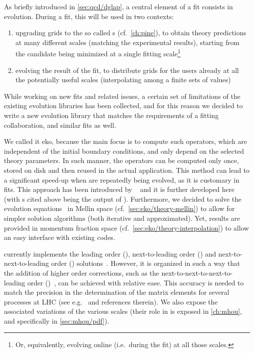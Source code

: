 
As briefly introduced in \cref{sec:qcd/dglap}, a central element of a \pdf fit
consists in \dglap evolution.
%
During a fit, this will be used in two contexts: 
\begin{enumerate}[label=\roman*.]
  \item upgrading grids to the so called \fktab{}s (cf.\ \cref{ch:pine}), to
    obtain theory predictions at many different scales (matching the
    experimental results), starting from the \pdf candidate being minimized at
    a single fitting scale\footnote{
      Or, equivalently, evolving online (i.e.\ during the fit) at all those scales.
    }
  \item evolving the result of the fit, to distribute \pdf grids for the users
    already at all the potentially useful scales (interpolating among a finite
    sets of values)
\end{enumerate}

While working on new \pdf fits and related issues, a certain set of limitations
of the existing \dglap evolution libraries has been collected, and for this
reason we decided to write a new \qcd{} evolution library that matches the
requirements of a \pdf fitting collaboration, and similar fits as well.

We called it \acrfull{eko}, because the main focus is to compute such
operators, which are independent of the initial boundary conditions, and only
depend on the selected theory parameters.
In such manner, the operators can be computed only once, stored on disk and
then reused in the actual application. This method can lead to a significant
speed-up when \pdfs are repeatedly being evolved, as it is customary in \pdf{}
fits.
This approach has been introduced by
\fk~\cite{Ball:2008by,Ball:2010de,DelDebbio:2007ee} and it is further developed
here (with \fktab{}s cited above being the output of \fk).
%
Furthermore, we decided to solve the evolution equations~ in Mellin space (cf.\
\cref{sec:eko/theory-mellin}) to allow for simpler solution algorithms (both
iterative and approximated).
Yet, results are provided in momentum fraction space (cf.\
\cref{sec:eko/theory-interpolation}) to allow an easy interface with existing
codes.

\eko{} currently implements the leading order (\lo{}),
next-to-leading order (\nlo{}) and next-to-next-to-leading order (\nnlo{})
solutions~\cite{Vogt:2004mw,Moch:2004pa,Blumlein:2021enk}.
However, it is organized in such a way that the addition of higher order corrections,
such as the next-to-next-to-next-to-leading order (\nnnlo{})~\cite{Moch:2021qrk},
can be achieved with relative ease.
This accuracy is needed to match the precision in the determination of the
matrix elements for several processes at LHC (see e.g.\ \cite{Duhr:2021vwj} and
references therein).
We also expose the associated variations of the various scales (their role in
\pdfs is exposed in \cref{ch:mhou}, and specifically in \cref{sec:mhou/pdf}).

